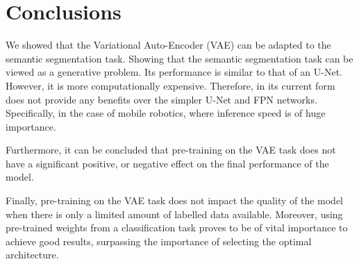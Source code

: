 \chapter{Conclusions}\label{chapter:conclusions}

We showed that the Variational Auto-Encoder (VAE) can be adapted to the semantic segmentation task. Showing that the semantic segmentation task can be viewed as a generative problem. Its performance is similar to that of an U-Net. However, it is more computationally expensive. Therefore, in its current form does not provide any benefits over the simpler U-Net and FPN networks. Specifically, in the case of mobile robotics, where inference speed is of huge importance.

Furthermore, it can be concluded that pre-training on the VAE task does not have a significant positive, or negative effect on the final performance of the model. 

Finally, pre-training on the VAE task does not impact the quality of the model when there is only a limited amount of labelled data available. Moreover, using pre-trained weights from a classification task proves to be of vital importance to achieve good results, surpassing the importance of selecting the optimal architecture.
